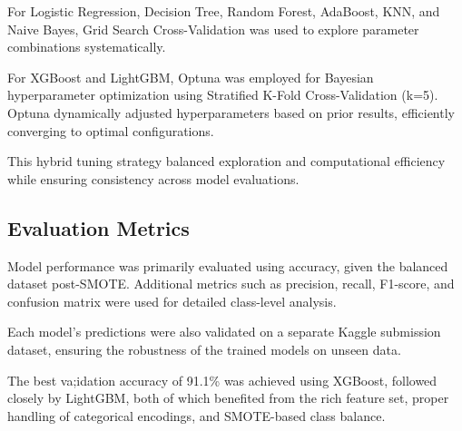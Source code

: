 For Logistic Regression, Decision Tree, Random Forest, AdaBoost, KNN, and Naive Bayes, Grid Search Cross-Validation was used to explore parameter combinations systematically.

For XGBoost and LightGBM, Optuna was employed for Bayesian hyperparameter optimization using Stratified K-Fold Cross-Validation (k=5).
Optuna dynamically adjusted hyperparameters based on prior results, efficiently converging to optimal configurations.

This hybrid tuning strategy balanced exploration and computational efficiency while ensuring consistency across model evaluations.

\subsection{Evaluation Metrics}\label{subsec:evaluation-metrics}
Model performance was primarily evaluated using accuracy, given the balanced dataset post-SMOTE.
Additional metrics such as precision, recall, F1-score, and confusion matrix were used for detailed class-level analysis.

Each model’s predictions were also validated on a separate Kaggle submission dataset, ensuring the robustness of the trained models on unseen data.

The best va;idation accuracy of 91.1\% was achieved using XGBoost, followed closely by LightGBM, both of which benefited from the rich feature set, proper handling of categorical encodings, and SMOTE-based class balance.
